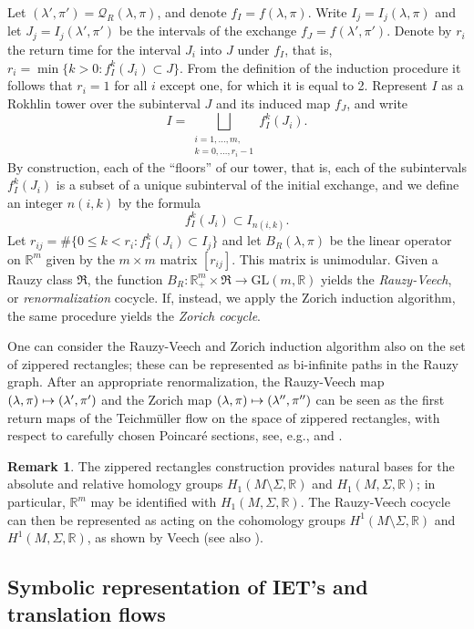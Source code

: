 \documentclass[11pt]{article}
\newcommand{\eg}{e.g.,\xspace}
\numberwithin{equation}{section}\newcommand{\Relation}[2][]{}\newtheorem*{prop*}{Proposition}
\let\mathcal\mathscr
\def\mto{\mathchoice{\longmapsto}{\mapsto}{\mapsto}{\mapsto}}
\newcommand{\GL}{\mathrm{GL}}
\theoremstyle{plain}
\theoremstyle{definition}
\newtheorem*{rem*}{Remark}
\let\lam\lambda
\let\Sig\Sigma
\newcommand\FrR{\mathfrak{R}}
\newcommand\Qk{\mathcal{Q}}
\newcommand{\R}{\mathbb{R}}
\newcommand\be{\begin{equation}}
\newcommand\ee{\end{equation}}
\begin{document}
Let $(\lam',\pi')=\Qk_R(\lam,\pi)$, and denote $f_I=f(\lam,\pi)$. Write $I_j = I_j(\lam,\pi)$ and let $J_j = I_j(\lam',\pi')$ be the intervals of the exchange $f_J=f(\lam',\pi')$. Denote by
$r_i$ the return time for the interval $J_i$ into $J$ under $f_I$, that is,
$r_i = \min\{k>0: f_I^k (J_i) \subset J\}$. From the definition of the induction procedure it follows that $r_i = 1$ for all $i$ except one, for which it is equal to 2.
Represent $I$ as a Rokhlin tower over the subinterval $J$ and its induced map $f_J$, and write
\be \label{Rokhlin1}
I = \bigsqcup_{\substack{i=1,\ldots,m,\\ k = 0, \ldots, r_i-1}} f_I^k (J_i).
\ee
By construction, each of the ``floors'' of our tower, that is, each of the subintervals $f_I^k (J_i)$ is a subset of a unique subinterval of the initial exchange, and we define an integer $n(i,k)$ by the formula
\be \label{Rokhlin2}
f_I^k (J_i) \subset I_{n(i,k)}.
\ee
{ Let $r_{ij} = \#\{0 \le k < r_i: f_I^k(J_i) \subset I_j\}$ and let
$B_R(\lam,\pi)$ be the linear operator on $\R^m$ given by the $m\times m$ matrix $[r_{ij}]$. } This matrix is unimodular. Given a Rauzy class $\FrR$, the function $B_R: \R^m_+\times \FrR \to \GL(m,\R)$ yields the \emph{Rauzy-Veech}, or \emph{renormalization} cocycle. If, instead, we apply the Zorich induction algorithm, the same procedure yields the \emph{Zorich cocycle}.

One can consider the Rauzy-Veech and Zorich induction algorithm also on the set of zippered rectangles; these can be represented as bi-infinite paths in the Rauzy graph. After an appropriate renormalization, the Rauzy-Veech map $(\lam,\pi)\mto (\lam',\pi')$ and the Zorich map $(\lam,\pi) \mto (\lam'',\pi'')$ can be seen as the first return maps of the Teichmüller flow on the space of zippered rectangles, with respect to carefully chosen Poincaré sections, see, \eg \cite[\S2.10]{viana2} and \cite[\S11.3]{yoccoz}.

\begin{rem*}
The zippered rectangles construction provides natural bases for the absolute and relative homology groups $H_1(M\setminus \Sig,\R)$ and $H_1(M,\Sig,\R)$; in particular, $\R^m$ may be identified with $H_1(M,\Sig,\R)$. The Rauzy-Veech cocycle can then be represented as acting on the cohomology groups
$H^1(M\setminus \Sig,\R)$ and $H^1(M,\Sig,\R)$, as shown by Veech \cite{veech} (see also \cite[\S2.9]{viana2}).
\end{rem*}


\subsection{Symbolic representation of IET's and translation flows} \label{subsec-symbol}
\end{document}
